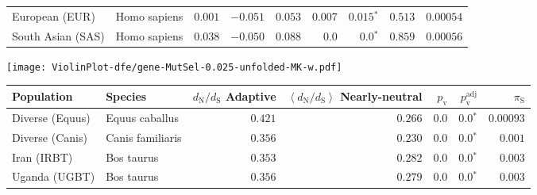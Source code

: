 \begin{center}
\begin{adjustbox}{width = 1\textwidth}
\begin{tabular}{|l|l|r|r|r|r|r|r|r|}
                 European (EUR) &         Homo sapiens &                                        $ 0.001$ &                                           $-0.051$ &                      $ 0.053$ &         $ 0.007$ &               $\bm{ 0.015{^*}}$ &                                           $ 0.513$ &          $0.00054$ \\
              South Asian (SAS) &         Homo sapiens &                                        $ 0.038$ &                                           $-0.050$ &                      $ 0.088$ &            $0.0$ &                  $\bm{0.0{^*}}$ &                                           $ 0.859$ &          $0.00056$ \\
\bottomrule
\end{tabular}
\end{adjustbox}
\newpage
\texttt{[image: ViolinPlot-dfe/gene-MutSel-0.025-unfolded-MK-w.pdf]} 
\begin{adjustbox}{width = 1\textwidth}
\begin{tabular}{|l|l|r|r|r|r|r|}
\toprule
                     Population &              Species & \specialcell{$d_{\mathrm{N}} / d_{\mathrm{S}}$ \\ Adaptive} & \specialcell{$\left< d_{\mathrm{N}} / d_{\mathrm{S}} \right>$ \\ Nearly-neutral} & $p_{\mathrm{v}}$ & $p_{\mathrm{v}}^{\mathrm{adj}}$ & $\pi_{\textrm{S}}$ \\
\midrule
                Diverse (Equus) &       Equus caballus &                                           $ 0.421$ &                                           $ 0.266$ &            $0.0$ &                  $\bm{0.0{^*}}$ &          $0.00093$ \\
                Diverse (Canis) &     Canis familiaris &                                           $ 0.356$ &                                           $ 0.230$ &            $0.0$ &                  $\bm{0.0{^*}}$ &           $ 0.001$ \\
                    Iran (IRBT) &           Bos taurus &                                           $ 0.353$ &                                           $ 0.282$ &            $0.0$ &                  $\bm{0.0{^*}}$ &           $ 0.003$ \\
                  Uganda (UGBT) &           Bos taurus &                                           $ 0.356$ &                                           $ 0.279$ &            $0.0$ &                  $\bm{0.0{^*}}$ &           $ 0.003$ \\

\end{tabular}
\end{adjustbox}
\end{center}
